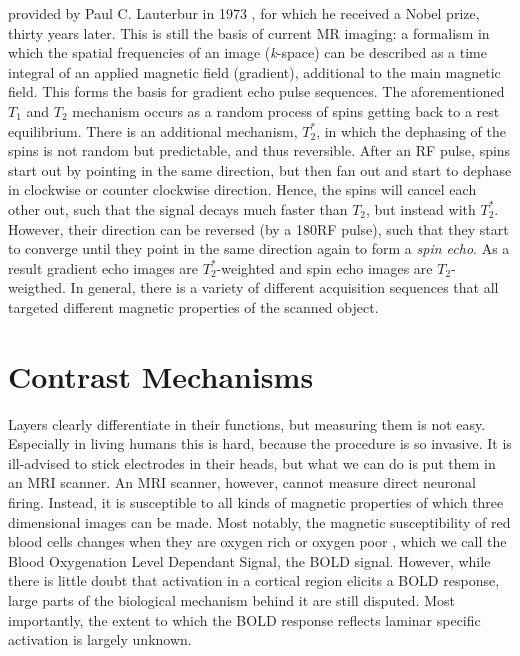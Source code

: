  provided by Paul C. Lauterbur in 1973 \cite{Lauterbur1973}, for which he received a Nobel prize, thirty years later. This is still the basis of current MR imaging: a formalism in which the spatial frequencies of an image (\emph{k}-space) can be described as a time integral of an applied magnetic field (gradient), additional to the main magnetic field. %
 This forms the basis for gradient echo pulse sequences.
The aforementioned $T_1$ and $T_2$ mechanism occurs as a random process of spins getting back to a rest equilibrium. There is an additional mechanism, $T_2^*$, in which the dephasing of the spins is not random but predictable, and thus reversible. After an RF pulse, spins start out by pointing in the same direction, but then fan out and start to dephase in clockwise or counter clockwise direction. Hence, the spins will cancel each other out, such that the signal decays much faster than $T_2$, but instead with $T_2^*$. However, their direction can be reversed (by a 180\textdegree RF pulse), such that they start to converge until they point in the same direction again to form a \emph{spin echo}. As a result gradient echo images are $T_2^*$-weighted and spin echo images are $T_2$-weigthed. In general, there is a variety of different acquisition sequences that all targeted different magnetic properties of the scanned object. 

\section*{Contrast Mechanisms}
Layers clearly differentiate in their functions, but measuring them is not easy. Especially in living humans this is hard, because the procedure is so invasive. It is ill-advised to stick electrodes in their heads, but what we can do is put them in an MRI scanner. An MRI scanner, however, cannot measure direct neuronal firing. Instead, it is susceptible to all kinds of magnetic properties of which three dimensional images can be made. Most notably, the magnetic susceptibility of red blood cells changes when they are oxygen rich or oxygen poor \cite{Ogawa1990}, which we call the Blood Oxygenation Level Dependant Signal, the BOLD signal. However, while there is little doubt that activation in a cortical region elicits a BOLD response, large parts of the biological mechanism behind it are still disputed. Most importantly, the extent to which the BOLD response reflects laminar specific activation is largely unknown.

